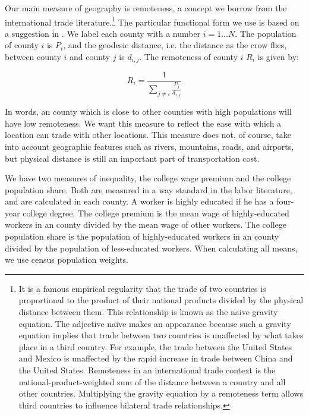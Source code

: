 \documentclass{article}
\begin{document}
Our main measure of geography is remoteness, a concept we borrow from the international trade literature.\footnote{It is a famous empirical regularity that the trade of two countries is proportional to the product of their national products divided by the physical distance between them.  This relationship is known as the naive gravity equation.  The adjective naive makes an appearance because such a gravity equation implies that trade between two countries is unaffected by what takes place in a third country.  For example, the trade between the United States and Mexico is unaffected by the rapid increase in trade between China and the United States.  Remoteness in an international trade context is the national-product-weighted sum of the distance between a country and all other countries.  Multiplying the gravity equation by a remoteness term allows third countries to influence bilateral trade relationships.}  The particular functional form we use is based on a suggestion in \citet{head2003gravity}.  We label each county with a number $i=1\dots N$.  The population of county $i$ is $P_i$, and the geodesic distance, i.e. the distance as the crow flies, between county $i$ and county $j$ is $d_{i,j}$.  The remoteness of county $i$ $R_i$ is given by:

\begin{equation}
    R_i = \frac{1}{\sum_{j\neq i} \frac{P_j}{d_{i,j}}} \nonumber
    \label{eq:rem}
\end{equation}

In words, an county which is close to other counties with high populations will have low remoteness.  We want this measure to reflect the ease with which a location can trade with other locations.  This measure does not, of course, take into account geographic features such as rivers, mountains, roads, and airports, but physical distance is still an important part of transportation cost.  

We have two measures of inequality, the college wage premium and the college population share.  Both are measured in a way standard in the labor literature, and are calculated in each county.  A worker is highly educated if he has a four-year college degree.  The college premium is the mean wage of highly-educated workers in an county divided by the mean wage of other workers.  The college population share is the population of highly-educated workers in an county divided by the population of less-educated workers.  When calculating all means, we use census population weights.
\end{document}
